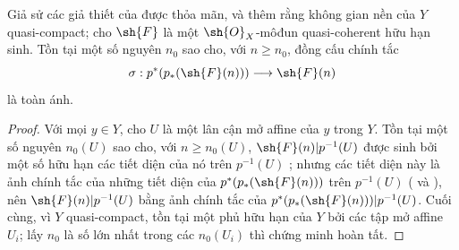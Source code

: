 \documentclass[oneside,10pt]{amsart}
\makeatletter
\renewcommand{\geq}{\geqslant}
\newcommand{\ega@arrow}[2]{\mathchoice{#1}{#2}{#2}{#2}}
\renewcommand{\to}{\ega@arrow{\longrightarrow}{\rightarrow}}
\let\EGAOriginalLabel\label
\renewcommand{\label}[1]{\phantomsection\EGAOriginalLabel{#1}}
\makeatother
\begin{document}
\begin{corollary}[3.4.6]
\label{II.3.4.6}
Giả sử các giả thiết của  được thỏa mãn, và thêm rằng không gian nền của $Y$ quasi-compact;
cho $\sh{F}$ là một $\sh{O}_X$-môđun quasi-coherent hữu hạn sinh.
Tồn tại một số nguyên $n_0$ sao cho, với $n\geq n_0$, đồng cấu chính tắc
\[
  \sigma:p^*(p_*(\sh{F}(n)))\to\sh{F}(n)
\]
 là toàn ánh.
\end{corollary}

\begin{proof}
Với mọi $y\in Y$, cho $U$ là một lân cận mở affine của $y$ trong $Y$.
Tồn tại một số nguyên $n_0(U)$ sao cho, với $n\geq n_0(U)$, $\sh{F}(n)|p^{-1}(U)$ được sinh bởi một số hữu hạn các tiết diện của nó trên $p^{-1}(U)$ ;
nhưng các tiết diện này là ảnh chính tắc của những tiết diện của $p^*(p_*(\sh{F}(n)))$ trên $p^{-1}(U)$ ( và ), nên $\sh{F}(n)|p^{-1}(U)$ bằng ảnh chính tắc của $p^*(p_*(\sh{F}(n)))|p^{-1}(U)$.
Cuối cùng, vì $Y$ quasi-compact, tồn tại một phủ hữu hạn của $Y$ bởi các tập mở affine $U_i$; lấy $n_0$ là số lớn nhất trong các $n_0(U_i)$ thì chứng minh hoàn tất.
\end{proof}
\end{document}
